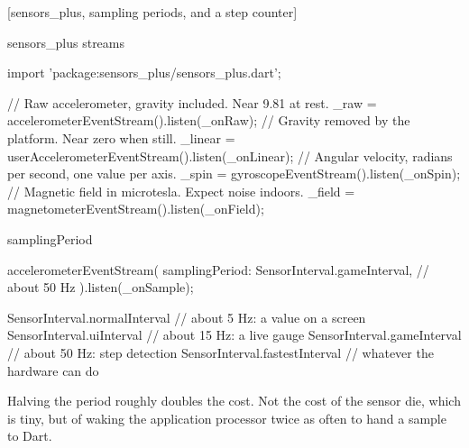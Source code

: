 \documentclass[10pt,aspectratio=169,t]{beamer}
\begin{document}
[sensors\_plus, sampling periods, and a step counter]

\begin{frame}[fragile,eyebrow=Reading sensors]{sensors\_plus streams}
\begin{dart}
import 'package:sensors_plus/sensors_plus.dart';

// Raw accelerometer, gravity included. Near 9.81 at rest.
_raw = accelerometerEventStream().listen(_onRaw);
// Gravity removed by the platform. Near zero when still.
_linear = userAccelerometerEventStream().listen(_onLinear);
// Angular velocity, radians per second, one value per axis.
_spin = gyroscopeEventStream().listen(_onSpin);
// Magnetic field in microtesla. Expect noise indoors.
_field = magnetometerEventStream().listen(_onField);
\end{dart}
  \vskip 1mm
\end{frame}

\begin{frame}[fragile,eyebrow=Reading sensors]{samplingPeriod}
\begin{dart}
accelerometerEventStream(
  samplingPeriod: SensorInterval.gameInterval,   // about 50 Hz
).listen(_onSample);

SensorInterval.normalInterval    // about 5 Hz: a value on a screen
SensorInterval.uiInterval        // about 15 Hz: a live gauge
SensorInterval.gameInterval      // about 50 Hz: step detection
SensorInterval.fastestInterval   // whatever the hardware can do
\end{dart}
  \begin{takeaway}{Halving the period roughly doubles the cost.}
    Not the cost of the sensor die, which is tiny, but of waking the application processor twice as often to hand a sample to Dart.
  \end{takeaway}
\end{frame}
\end{document}
